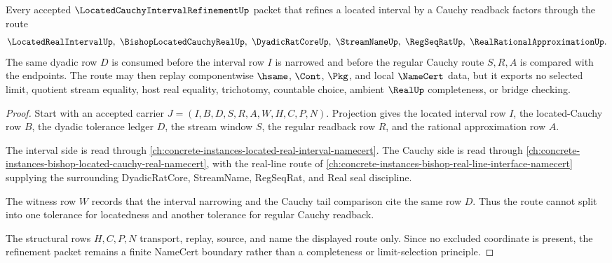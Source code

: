 \begin{theorem}
\label{thm:located-cauchy-interval-refinement-cauchy-route}
Every accepted $\LocatedCauchyIntervalRefinementUp$ packet that refines a located interval by a Cauchy readback factors through the route
$$
\LocatedRealIntervalUp,\ \BishopLocatedCauchyRealUp,\ \DyadicRatCoreUp,\ \StreamNameUp,\ \RegSeqRatUp,\ \RealRationalApproximationUp .
$$
The same dyadic row $D$ is consumed before the interval row $I$ is narrowed and before the regular Cauchy route $S,R,A$ is compared with the endpoints. The route may then replay componentwise $\hsame$, $\Cont$, $\Pkg$, and local $\NameCert$ data, but it exports no selected limit, quotient stream equality, host real equality, trichotomy, countable choice, ambient $\RealUp$ completeness, or bridge checking.
\end{theorem}
\begin{proof}
Start with an accepted carrier $J=(I,B,D,S,R,A,W,H,C,P,N)$. Projection gives the located interval row $I$, the located-Cauchy row $B$, the dyadic tolerance ledger $D$, the stream window $S$, the regular readback row $R$, and the rational approximation row $A$.

The interval side is read through \autoref{ch:concrete-instances-located-real-interval-namecert}. The Cauchy side is read through \autoref{ch:concrete-instances-bishop-located-cauchy-real-namecert}, with the real-line route of \autoref{ch:concrete-instances-bishop-real-line-interface-namecert} supplying the surrounding DyadicRatCore, StreamName, RegSeqRat, and Real seal discipline.

The witness row $W$ records that the interval narrowing and the Cauchy tail comparison cite the same row $D$. Thus the route cannot split into one tolerance for locatedness and another tolerance for regular Cauchy readback.

The structural rows $H,C,P,N$ transport, replay, source, and name the displayed route only. Since no excluded coordinate is present, the refinement packet remains a finite NameCert boundary rather than a completeness or limit-selection principle.
\end{proof}


